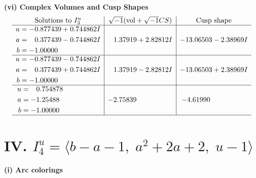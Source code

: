 \documentclass[1p]{elsarticle_modified}
\theoremstyle{definition}
\newcommand{\I}{\sqrt{-1}}
\begin{document}
\newpage\flushleft \textbf{(vi) Complex Volumes and Cusp Shapes}
$$\begin{array}{c|c|c}  
\text{Solutions to }I^u_{3}& \I (\text{vol} + \sqrt{-1}CS) & \text{Cusp shape}\\
 \hline 
\begin{aligned}
u &= -0.877439 + 0.744862 I \\
a &= \phantom{-}0.377439 - 0.744862 I \\
b &= -1.00000\phantom{ +0.000000I}\end{aligned}
 & \phantom{-}1.37919 + 2.82812 I & -13.06503 - 2.38969 I \\ \hline\begin{aligned}
u &= -0.877439 - 0.744862 I \\
a &= \phantom{-}0.377439 + 0.744862 I \\
b &= -1.00000\phantom{ +0.000000I}\end{aligned}
 & \phantom{-}1.37919 - 2.82812 I & -13.06503 + 2.38969 I \\ \hline\begin{aligned}
u &= \phantom{-}0.754878\phantom{ +0.000000I} \\
a &= -1.25488\phantom{ +0.000000I} \\
b &= -1.00000\phantom{ +0.000000I}\end{aligned}
 & -2.75839\phantom{ +0.000000I} & -4.61990\phantom{ +0.000000I}\\
 \hline 
 \end{array}$$\newpage\newpage\renewcommand{\arraystretch}{1}
\centering \section*{IV. $I^u_{4}= \langle b- a-1,\;a^2+2 a+2,\;u-1 \rangle$}
\flushleft \textbf{(i) Arc colorings}\\
\end{document}
